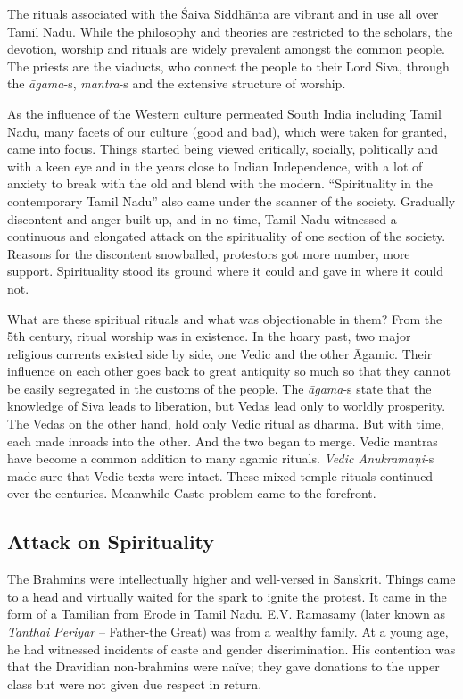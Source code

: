 The rituals associated with the Śaiva Siddhānta are vibrant and in use all over Tamil Nadu. While the philosophy and theories are restricted to the scholars, the devotion, worship and rituals are widely prevalent amongst the common people. The priests are the viaducts, who connect the people to their Lord Siva, through the \textit{āgama}-s, \textit{mantra}-s and the extensive structure of worship.

As the influence of the Western culture permeated South India including Tamil Nadu, many facets of our culture (good and bad), which were taken for granted, came into focus. Things started being viewed critically, socially, politically and with a keen eye and in the years close to Indian Independence, with a lot of anxiety to break with the old and blend with the modern. “Spirituality in the contemporary Tamil Nadu” also came under the scanner of the society. Gradually discontent and anger built up, and in no time, Tamil Nadu witnessed a continuous and elongated attack on the spirituality of one section of the society. Reasons for the discontent snowballed, protestors got more number, more support. Spirituality stood its ground where it could and gave in where it could not.

What are these spiritual rituals and what was objectionable in them? From the 5th century, ritual worship was in existence. In the hoary past, two major religious currents existed side by side, one Vedic and the other Āgamic. Their influence on each other goes back to great antiquity so much so that they cannot be easily segregated in the customs of the people. The \textit{āgama}-s state that the knowledge of Siva leads to liberation, but Vedas lead only to worldly prosperity. The Vedas on the other hand, hold only Vedic ritual as dharma. But with time, each made inroads into the other. And the two began to merge. Vedic mantras have become a common addition to many agamic rituals. \textit{Vedic Anukramaņi}-s made sure that Vedic texts were intact. These mixed temple rituals continued over the centuries. Meanwhile Caste problem came to the forefront.

\subsection{Attack on Spirituality}

The Brahmins were intellectually higher and well-versed in Sanskrit. Things came to a head and virtually waited for the spark to ignite the protest. It came in the form of a Tamilian from Erode in Tamil Nadu. E.V. Ramasamy (later known as \textit{Tanthai Periyar} – Father-the Great) was from a wealthy family. At a young age, he had witnessed incidents of caste and gender discrimination. His contention was that the Dravidian non-brahmins were naïve; they gave donations to the upper class but were not given due respect in return. 

